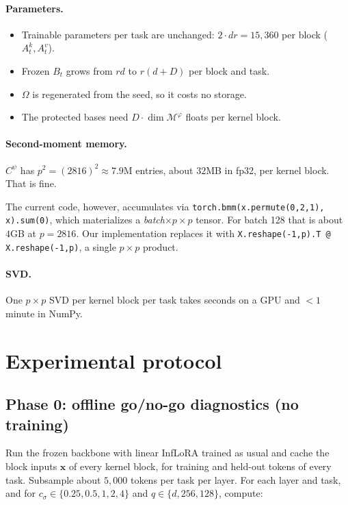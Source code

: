\documentclass[11pt]{article}
\theoremstyle{plain}
\theoremstyle{definition}
\theoremstyle{remark}
\newcommand{\M}{\mathcal{M}}
\newcommand{\x}{\bm{x}}
\newcommand{\code}[1]{\texttt{#1}}
\begin{document}
\paragraph{Parameters.}
\begin{itemize}[nosep]
\item Trainable parameters per task are unchanged: $2\cdot d r=15{,}360$ per block ($A^k_t,A^v_t$).
\item Frozen $B_t$ grows from $r d$ to $r(d+D)$ per block and task.
\item $\Omega$ is regenerated from the seed, so it costs no storage.
\item The protected bases need $D\cdot\dim\M^\varphi$ floats per kernel block.
\end{itemize}

\paragraph{Second-moment memory.}
$C^\psi$ has $p^2=(2816)^2\approx7.9$M entries, about $32$MB in fp32, per kernel block. That is fine.

The current code, however, accumulates via \code{torch.bmm(x.permute(0,2,1), x).sum(0)}, which materializes a \emph{batch}$\times p\times p$ tensor. For batch 128 that is about $4$GB at $p=2816$. Our implementation replaces it with \code{X.reshape(-1,p).T @ X.reshape(-1,p)}, a single $p\times p$ product.

\paragraph{SVD.}
One $p\times p$ SVD per kernel block per task takes seconds on a GPU and $<1$ minute in NumPy.

\section{Experimental protocol}\label{sec:experiments}

\subsection{Phase 0: offline go/no-go diagnostics (no training)}\label{sec:phase0}
Run the frozen backbone with linear InfLoRA trained as usual and cache the block inputs $\x$ of every kernel block, for training and held-out tokens of every task. Subsample about $5{,}000$ tokens per task per layer. For each layer and task, and for $c_\sigma\in\{0.25,0.5,1,2,4\}$ and $q\in\{d,256,128\}$, compute:
\end{document}
